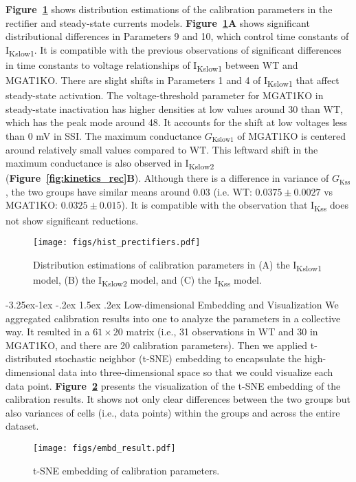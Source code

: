 \documentclass[11pt]{article}
\makeatletter
\renewcommand\subsection{\@startsection{subsection}{2}{\z@}%
                                     {-3.25ex\@plus -1ex \@minus -.2ex}%
                                     {1.5ex \@plus .2ex}%
                                     {\normalfont\fontfamily{phv}\fontsize{14}{17}\bfseries}}
\makeatother
\begin{document}
\textbf{Figure~\ref{fig:hist_prectifiers}} shows distribution estimations of the calibration parameters in the rectifier and steady-state currents models. \textbf{Figure~\ref{fig:hist_prectifiers}A} shows significant distributional differences in Parameters 9 and 10, which control time constants of I\textsubscript{Kslow1}. It is compatible with the previous observations of significant differences in time constants to voltage relationships of I\textsubscript{Kslow1} between WT and MGAT1KO. There are slight shifts in Parameters 1 and 4 of I\textsubscript{Kslow1} that affect steady-state activation. The voltage-threshold parameter for MGAT1KO in steady-state inactivation has higher densities at low values around 30 than WT, which has the peak mode around 48. It accounts for the shift at low voltages less than 0 mV in SSI. The maximum conductance $G_{\mathrm{Kslow1}}$ of MGAT1KO is centered around relatively small values compared to WT. This leftward shift in the maximum conductance is also observed in I\textsubscript{Kslow2} (\textbf{Figure~\ref{fig:kinetics_rec}B}). Although there is a difference in variance of $G_{\mathrm{Kss}}$, the two groups have similar means around 0.03 (i.e. WT: $0.0375\pm0.0027$ vs MGAT1KO: $0.0325\pm0.015$). It is compatible with the observation that I\textsubscript{Kss} does not show significant reductions. 
\begin{figure}[!ht]
    \centering
    \texttt{[image: figs/hist\_prectifiers.pdf]}
    \caption{Distribution estimations of calibration parameters in (A) the I\textsubscript{Kslow1} model, (B) the I\textsubscript{Kslow2} model, and (C) the I\textsubscript{Kss} model.}
    \label{fig:hist_prectifiers}
\end{figure}

\subsection{Low-dimensional Embedding and Visualization}
We aggregated calibration results into one to analyze the parameters in a collective way. It resulted in a $61\times20$ matrix (i.e., 31 observations in WT and 30 in MGAT1KO, and there are 20 calibration parameters). Then we applied t-distributed stochastic neighbor (t-SNE) embedding to encapsulate the high-dimensional data into three-dimensional space so that we could visualize each data point. \textbf{Figure~\ref{fig:embd_result}} presents the visualization of the t-SNE embedding of the calibration results. It shows not only clear differences between the two groups but also variances of cells (i.e., data points) within the groups and across the entire dataset.
\begin{figure}[!ht]
    \centering
    \texttt{[image: figs/embd\_result.pdf]}
    \caption{t-SNE embedding of calibration parameters.}
    \label{fig:embd_result}
\end{figure}
\end{document}
